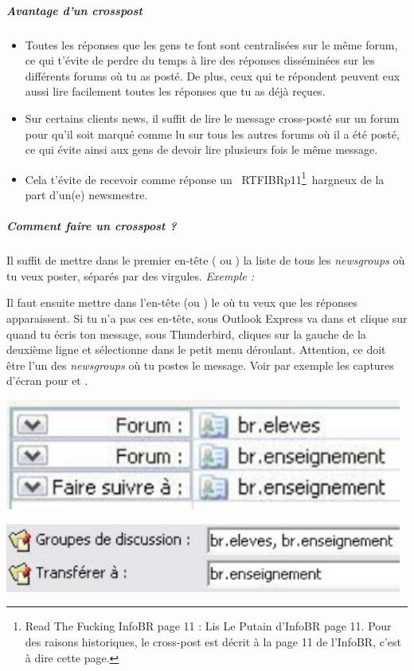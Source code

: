 \subparagraph{Avantage d'un crosspost}
\begin{itemize}
 \item Toutes les réponses que les gens te font sont centralisées sur le même forum,
       ce qui t'évite de perdre du temps à lire des réponses disséminées
       sur les différents forums où tu as posté.
       De plus, ceux qui te répondent peuvent eux aussi lire facilement toutes les réponses
       que tu as déjà reçues.
 \item Sur certains clients news, il suffit de lire le message cross-posté sur un forum
       pour qu'il soit marqué comme lu sur tous les autres forums où il a été posté,
       ce qui évite ainsi aux gens de devoir lire plusieurs fois le même message.
 \item Cela t'évite de recevoir comme réponse un \guillemotleft~RTFIBRp11\footnote{Read The Fucking InfoBR page 11 :
       Lis Le Putain d'InfoBR page 11. Pour des raisons historiques, le cross-post est décrit à la page 11
       de l'InfoBR, c'est à dire cette page.}~\guillemotright  hargneux de la part d'un(e) newsmestre.
\end{itemize}

\subparagraph{Comment faire un crosspost ?}
Il suffit de mettre dans le premier en-tête ( ou ) la liste de tous les \emph{newsgroups} où tu veux
poster, séparés par des virgules. \emph{Exemple :} 

Il faut ensuite mettre dans l'en-tête  (ou ) le  où tu veux que les réponses apparaissent. Si
tu n'a pas ces en-tête, sous Outlook Express va dans  et clique sur  quand tu écris ton message, sous
Thunderbird, cliques sur la gauche de la deuxième ligne et sélectionne  dans le petit menu déroulant. Attention, ce doit être
l'un des \emph{newsgroups} où tu postes le message.
Voir par exemple les captures d'écran pour  et .\\

\noindent
\begin{minipage}{0.48\textwidth}
\includegraphics[width=0.98\textwidth]{images/cross_post_TB}
\end{minipage}
\begin{minipage}{0.48\textwidth}
\includegraphics[width=0.98\textwidth]{images/cross_post_OE}
\end{minipage}


